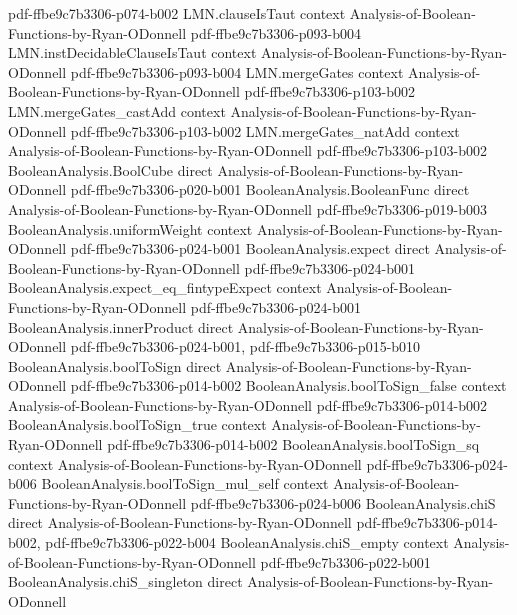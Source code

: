 \begin{lemma}
  {pdf-ffbe9c7b3306-p074-b002}
\proofstep
  {LMN.clauseIsTaut}
  {context}
  {Analysis-of-Boolean-Functions-by-Ryan-ODonnell}
  {pdf-ffbe9c7b3306-p093-b004}
\proofstep
  {LMN.instDecidableClauseIsTaut}
  {context}
  {Analysis-of-Boolean-Functions-by-Ryan-ODonnell}
  {pdf-ffbe9c7b3306-p093-b004}
\proofstep
  {LMN.mergeGates}
  {context}
  {Analysis-of-Boolean-Functions-by-Ryan-ODonnell}
  {pdf-ffbe9c7b3306-p103-b002}
\proofstep
  {LMN.mergeGates_castAdd}
  {context}
  {Analysis-of-Boolean-Functions-by-Ryan-ODonnell}
  {pdf-ffbe9c7b3306-p103-b002}
\proofstep
  {LMN.mergeGates_natAdd}
  {context}
  {Analysis-of-Boolean-Functions-by-Ryan-ODonnell}
  {pdf-ffbe9c7b3306-p103-b002}
\proofstep
  {BooleanAnalysis.BoolCube}
  {direct}
  {Analysis-of-Boolean-Functions-by-Ryan-ODonnell}
  {pdf-ffbe9c7b3306-p020-b001}
\proofstep
  {BooleanAnalysis.BooleanFunc}
  {direct}
  {Analysis-of-Boolean-Functions-by-Ryan-ODonnell}
  {pdf-ffbe9c7b3306-p019-b003}
\proofstep
  {BooleanAnalysis.uniformWeight}
  {context}
  {Analysis-of-Boolean-Functions-by-Ryan-ODonnell}
  {pdf-ffbe9c7b3306-p024-b001}
\proofstep
  {BooleanAnalysis.expect}
  {direct}
  {Analysis-of-Boolean-Functions-by-Ryan-ODonnell}
  {pdf-ffbe9c7b3306-p024-b001}
\proofstep
  {BooleanAnalysis.expect_eq_fintypeExpect}
  {context}
  {Analysis-of-Boolean-Functions-by-Ryan-ODonnell}
  {pdf-ffbe9c7b3306-p024-b001}
\proofstep
  {BooleanAnalysis.innerProduct}
  {direct}
  {Analysis-of-Boolean-Functions-by-Ryan-ODonnell}
  {pdf-ffbe9c7b3306-p024-b001,
    pdf-ffbe9c7b3306-p015-b010}
\proofstep
  {BooleanAnalysis.boolToSign}
  {direct}
  {Analysis-of-Boolean-Functions-by-Ryan-ODonnell}
  {pdf-ffbe9c7b3306-p014-b002}
\proofstep
  {BooleanAnalysis.boolToSign_false}
  {context}
  {Analysis-of-Boolean-Functions-by-Ryan-ODonnell}
  {pdf-ffbe9c7b3306-p014-b002}
\proofstep
  {BooleanAnalysis.boolToSign_true}
  {context}
  {Analysis-of-Boolean-Functions-by-Ryan-ODonnell}
  {pdf-ffbe9c7b3306-p014-b002}
\proofstep
  {BooleanAnalysis.boolToSign_sq}
  {context}
  {Analysis-of-Boolean-Functions-by-Ryan-ODonnell}
  {pdf-ffbe9c7b3306-p024-b006}
\proofstep
  {BooleanAnalysis.boolToSign_mul_self}
  {context}
  {Analysis-of-Boolean-Functions-by-Ryan-ODonnell}
  {pdf-ffbe9c7b3306-p024-b006}
\proofstep
  {BooleanAnalysis.chiS}
  {direct}
  {Analysis-of-Boolean-Functions-by-Ryan-ODonnell}
  {pdf-ffbe9c7b3306-p014-b002,
    pdf-ffbe9c7b3306-p022-b004}
\proofstep
  {BooleanAnalysis.chiS_empty}
  {context}
  {Analysis-of-Boolean-Functions-by-Ryan-ODonnell}
  {pdf-ffbe9c7b3306-p022-b001}
\proofstep
  {BooleanAnalysis.chiS_singleton}
  {direct}
  {Analysis-of-Boolean-Functions-by-Ryan-ODonnell}

\end{lemma}
